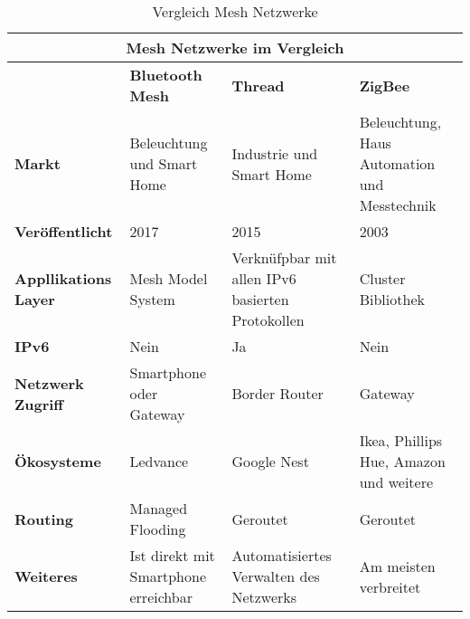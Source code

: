 \begin{table}[h]
	\centering
	\begin{adjustbox}{width=1\textwidth}
	\begin{tabular}{@{}|l|l|l|l|@{}}
		\toprule
		\multicolumn{4}{|c|}{\textbf{Mesh Netzwerke im Vergleich}}                                                                                                            \\ \midrule
		& \textbf{Bluetooth Mesh}              & \textbf{Thread}                                  & \textbf{ZigBee}                              \\ \midrule
		\textbf{Markt}               & Beleuchtung und Smart Home           & Industrie und Smart Home                         & Beleuchtung, Haus Automation und Messtechnik \\ \midrule
		\textbf{Veröffentlicht}      & 2017                                 & 2015                                             & 2003                                         \\ \midrule
		\textbf{Appllikations Layer} & Mesh Model System                    & Verknüfpbar mit allen IPv6 basierten Protokollen & Cluster Bibliothek                           \\ \midrule
		\textbf{IPv6}                & Nein                                 & Ja                                               & Nein                                         \\ \midrule
		\textbf{Netzwerk Zugriff}    & Smartphone oder Gateway              & Border Router                                    & Gateway                                      \\ \midrule
		\textbf{Ökosysteme}          & Ledvance                             & Google Nest                                      & Ikea, Phillips Hue, Amazon und weitere       \\ \midrule
		\textbf{Routing}             & Managed Flooding                     & Geroutet                                         & Geroutet                                     \\ \midrule
		\textbf{Weiteres}            & Ist direkt mit Smartphone erreichbar & Automatisiertes Verwalten des Netzwerks          & Am meisten verbreitet                        \\ \bottomrule
	\end{tabular}
	\end{adjustbox}
	\caption{Vergleich Mesh Netzwerke}
	\label{table:VergleichMeshNetzwerk}
\end{table}